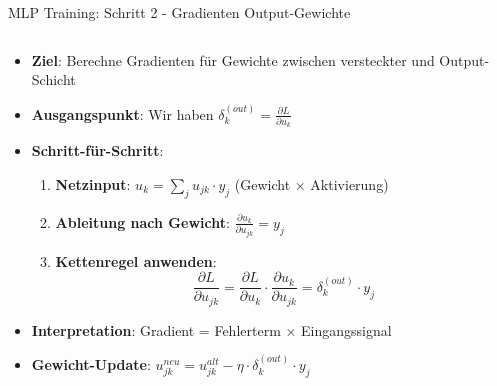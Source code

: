 \documentclass[aspectratio=1610, xcolor=dvipsnames, 9pt]{beamer}
\begin{document}
      \begin{frame}{MLP Training: Schritt 2 - Gradienten Output-Gewichte}
        \begin{columns}
          \begin{column}{1\textwidth}
            \begin{itemize}
              \item \textbf{Ziel}: Berechne Gradienten für Gewichte zwischen versteckter und Output-Schicht
              \item \textbf{Ausgangspunkt}: Wir haben $\delta_k^{(out)} = \frac{\partial L}{\partial u_k}$
              \item \textbf{Schritt-für-Schritt}:
              \begin{enumerate}
                \item \textbf{Netzinput}: $u_k = \sum_j u_{jk} \cdot y_j$ (Gewicht × Aktivierung)
                \item \textbf{Ableitung nach Gewicht}: $\frac{\partial u_k}{\partial u_{jk}} = y_j$
                \item \textbf{Kettenregel anwenden}:
                \begin{equation}
                  \frac{\partial L}{\partial u_{jk}} = \frac{\partial L}{\partial u_k} \cdot \frac{\partial u_k}{\partial u_{jk}} = \delta_k^{(out)} \cdot y_j
                \end{equation}
              \end{enumerate}
              \item \textbf{Interpretation}: Gradient = Fehlerterm × Eingangssignal
              \item \textbf{Gewicht-Update}: $u_{jk}^{neu} = u_{jk}^{alt} - \eta \cdot \delta_k^{(out)} \cdot y_j$
            \end{itemize}
          \end{column}
        \end{columns}
      \end{frame}
\end{document}
